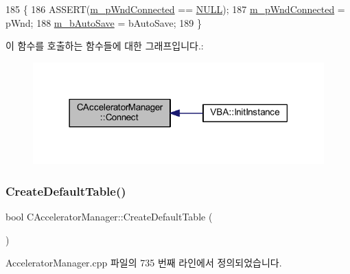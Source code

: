 \begin{DoxyCode}
185 \{
186   ASSERT(\mbox{\hyperlink{class_c_accelerator_manager_a24f706c75f754982051e1d7fad1916da}{m\_pWndConnected}} == \mbox{\hyperlink{getopt1_8c_a070d2ce7b6bb7e5c05602aa8c308d0c4}{NULL}});
187   \mbox{\hyperlink{class_c_accelerator_manager_a24f706c75f754982051e1d7fad1916da}{m\_pWndConnected}} = pWnd;
188   \mbox{\hyperlink{class_c_accelerator_manager_a37b504c74c13ca2d62eea8abffe73102}{m\_bAutoSave}} = bAutoSave;
189 \}
\end{DoxyCode}
이 함수를 호출하는 함수들에 대한 그래프입니다.\+:
\nopagebreak
\begin{figure}[H]
\begin{center}
\leavevmode
\includegraphics[width=318pt]{class_c_accelerator_manager_a2d01e04665e3d03f3c1410bd69b0a82c_icgraph}
\end{center}
\end{figure}
\mbox{\label{class_c_accelerator_manager_aaefac809b336df14e1a1a7d60f72ae28}} 
\subsubsection{\texorpdfstring{Create\+Default\+Table()}{CreateDefaultTable()}}
{\footnotesize\ttfamily bool C\+Accelerator\+Manager\+::\+Create\+Default\+Table (\begin{DoxyParamCaption}{ }\end{DoxyParamCaption})}



Accelerator\+Manager.\+cpp 파일의 735 번째 라인에서 정의되었습니다.


